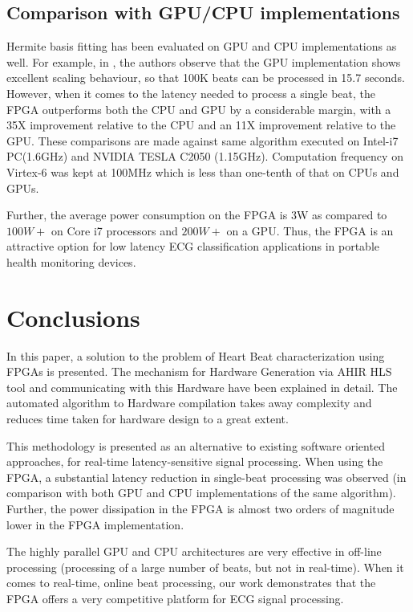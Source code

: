 \documentclass[runningheads]{llncs}
\begin{document}
\subsection{Comparison with GPU/CPU implementations}

Hermite basis fitting has been evaluated on GPU and CPU implementations
as well.  For example, in \cite{c:GPU}, the authors observe that
the GPU implementation shows excellent scaling behaviour, so that 
100K beats can be processed in 15.7 seconds.  However, when it comes
to the latency needed to process a single beat, the FPGA outperforms both 
the CPU and GPU by a considerable margin, with a 35X improvement relative to
the CPU and an 11X improvement relative to the GPU. 
These comparisons are made against same algorithm executed on Intel-i7 PC(1.6GHz) 
and NVIDIA TESLA C2050 (1.15GHz). Computation frequency on Virtex-6 was kept at 100MHz which is
less than one-tenth of that on CPUs and GPUs. 

Further, the average power consumption on the FPGA is 3W as compared to $100W+$ on Core i7 processors and
$200W+$ on a GPU.  %
Thus, the FPGA is an attractive option for low latency ECG classification
applications in portable health monitoring devices.

\section{Conclusions}\label{s:conclusions}

In this paper, a solution to the problem of Heart Beat characterization using FPGAs is presented.
The mechanism for Hardware Generation via AHIR HLS tool and communicating with this Hardware have
been explained in detail. The automated algorithm to Hardware compilation takes away complexity
and reduces time taken for hardware design to a great extent.

This methodology is presented as an alternative to existing software oriented approaches, 
for real-time latency-sensitive signal processing. When using the FPGA, a substantial
latency reduction in single-beat processing was observed (in comparison with both
GPU and CPU implementations of the same algorithm).  
Further, the power dissipation in
the FPGA is almost two orders of magnitude lower in the FPGA implementation.

The highly parallel GPU and CPU architectures are very effective in off-line processing
(processing of a large number of beats, but not in real-time).  When it comes to real-time,
online beat processing, our work demonstrates that the FPGA offers a very competitive 
platform for ECG signal processing.

 


\end{document}
